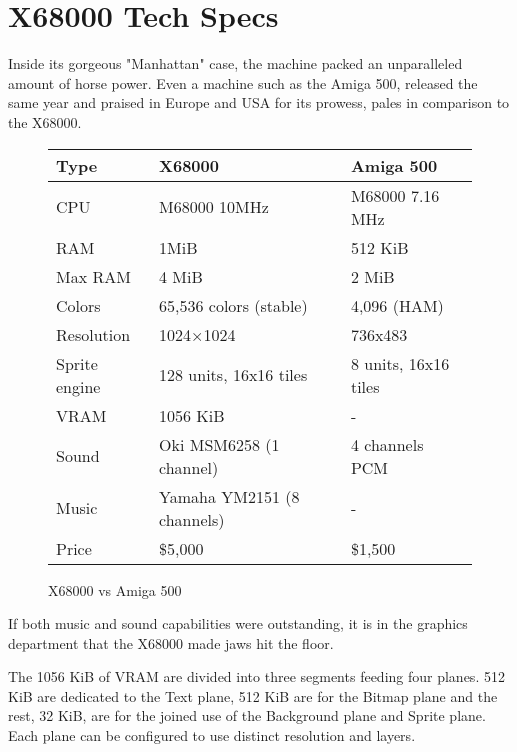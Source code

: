 \pagebreak



\section{X68000 Tech Specs}  
Inside its gorgeous "Manhattan" case, the machine packed an unparalleled amount of horse power. Even a machine such as the Amiga 500, released the same year and praised in Europe and USA for its prowess, pales in comparison to the X68000. 


 \begin{figure}[H]
\begin{tabularx}{\textwidth}{lXX}
  \toprule    
  \textbf{Type } & \textbf{ X68000 } & \textbf{ Amiga 500 }\\  
  \toprule   
    
CPU & M68000 10MHz & M68000 7.16 MHz\\  
RAM & 1MiB & 512 KiB\\
Max RAM & 4 MiB & 2 MiB\\ 
Colors  & 65,536 colors (stable) & 4,096 (HAM) \\
Resolution & 1024×1024 & 736x483 \\
Sprite engine & 128 units, 16x16 tiles & 8 units, 16x16 tiles\\
VRAM & 1056 KiB & -\\
Sound & Oki MSM6258 (1 channel)  & 4 channels PCM\\ 
Music & Yamaha YM2151 (8 channels)  & -\\ 
Price & \$5,000 & \$1,500 \\
  \toprule   
\end{tabularx}
\caption*{X68000 vs Amiga 500}
\end{figure}


If both music and sound capabilities were outstanding, it is in the graphics department that the X68000 made jaws hit the floor.

The 1056 KiB of VRAM are divided into three segments feeding four planes. 512 KiB are dedicated to the Text plane, 512 KiB are for the Bitmap plane and the rest, 32 KiB, are for the joined use of the Background plane and Sprite plane. Each plane can be configured to use distinct resolution and layers.


